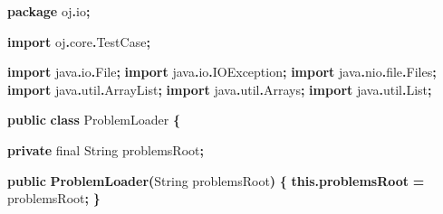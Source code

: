 \documentclass[
  11pt,
]{ctexart}
\newenvironment{Shaded}{\begin{snugshade}}{\end{snugshade}}
\newcommand{\BuiltInTok}[1]{#1}
\newcommand{\DataTypeTok}[1]{\textcolor[rgb]{0.13,0.29,0.53}{#1}}
\newcommand{\FunctionTok}[1]{\textcolor[rgb]{0.13,0.29,0.53}{\textbf{#1}}}
\newcommand{\ImportTok}[1]{#1}
\newcommand{\KeywordTok}[1]{\textcolor[rgb]{0.13,0.29,0.53}{\textbf{#1}}}
\newcommand{\NormalTok}[1]{#1}
\newcommand{\OperatorTok}[1]{\textcolor[rgb]{0.81,0.36,0.00}{\textbf{#1}}}
\begin{document}
\begin{Shaded}
\begin{Highlighting}[]
\KeywordTok{package}\ImportTok{ oj}\OperatorTok{.}\ImportTok{io}\OperatorTok{;}

\KeywordTok{import} \ImportTok{oj}\OperatorTok{.}\ImportTok{core}\OperatorTok{.}\ImportTok{TestCase}\OperatorTok{;}

\KeywordTok{import} \ImportTok{java}\OperatorTok{.}\ImportTok{io}\OperatorTok{.}\ImportTok{File}\OperatorTok{;}
\KeywordTok{import} \ImportTok{java}\OperatorTok{.}\ImportTok{io}\OperatorTok{.}\ImportTok{IOException}\OperatorTok{;}
\KeywordTok{import} \ImportTok{java}\OperatorTok{.}\ImportTok{nio}\OperatorTok{.}\ImportTok{file}\OperatorTok{.}\ImportTok{Files}\OperatorTok{;}
\KeywordTok{import} \ImportTok{java}\OperatorTok{.}\ImportTok{util}\OperatorTok{.}\ImportTok{ArrayList}\OperatorTok{;}
\KeywordTok{import} \ImportTok{java}\OperatorTok{.}\ImportTok{util}\OperatorTok{.}\ImportTok{Arrays}\OperatorTok{;}
\KeywordTok{import} \ImportTok{java}\OperatorTok{.}\ImportTok{util}\OperatorTok{.}\ImportTok{List}\OperatorTok{;}

\KeywordTok{public} \KeywordTok{class}\NormalTok{ ProblemLoader }\OperatorTok{\{}

    \KeywordTok{private} \DataTypeTok{final} \BuiltInTok{String}\NormalTok{ problemsRoot}\OperatorTok{;}

    \KeywordTok{public} \FunctionTok{ProblemLoader}\OperatorTok{(}\BuiltInTok{String}\NormalTok{ problemsRoot}\OperatorTok{)} \OperatorTok{\{}
        \KeywordTok{this}\OperatorTok{.}\FunctionTok{problemsRoot} \OperatorTok{=}\NormalTok{ problemsRoot}\OperatorTok{;}
    \OperatorTok{\}}


\end{Highlighting}
\end{Shaded}
\end{document}
